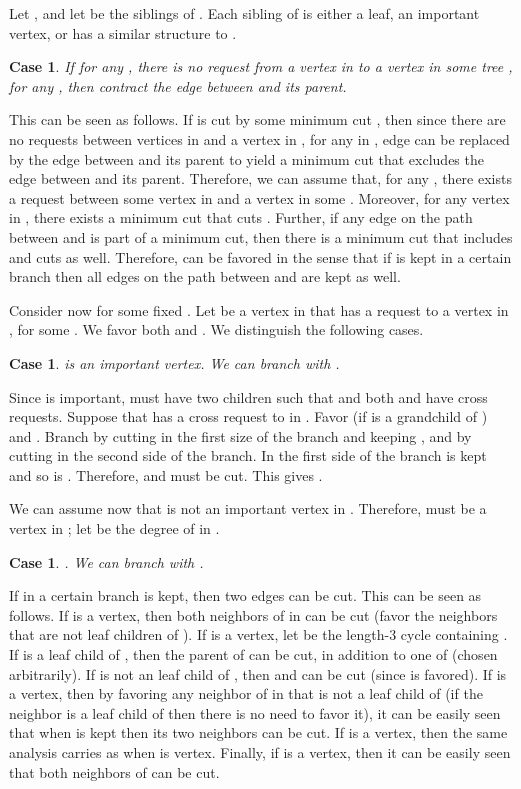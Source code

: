 \documentclass[11pt]{article}
\newtheorem{case}[theorem]{Case}
\begin{document}


Let , and let  be the siblings of . Each sibling  of  is either a leaf, an important vertex, or  has a similar structure to .

\begin{case}
\label{case:100}
If for any , there is no request from a vertex in  to a vertex in some tree , for any , then contract the edge between  and its parent.
\end{case}
This can be seen as follows. If  is cut by some minimum cut , then since there are no requests between vertices in  and a vertex in , for any  in , edge  can be replaced by the edge between  and its parent to yield a minimum cut that excludes the edge between  and its parent. Therefore, we can assume that, for any , there exists a request between some vertex in  and a vertex in some . Moreover, for any vertex  in , there exists a minimum cut that cuts . Further, if any edge  on the path between  and  is part of a minimum cut, then there is a minimum cut that includes  and cuts  as well. Therefore,  can be favored in the sense that if  is kept in a certain branch then all edges on the path between  and  are kept as well.


Consider now  for some fixed . Let  be a vertex in  that has a request to a vertex  in , for some . We favor both  and .  We distinguish the following cases.

\begin{case}
\label{case:200}
 is an important vertex. We can branch with .
\end{case}

Since  is important,  must have two children  such that  and both  and  have cross requests. Suppose that  has a cross request to  in . Favor  (if  is a grandchild of ) and . Branch by cutting  in the first size of the branch and keeping , and by cutting  in the second side of the branch. In the first side of the branch  is kept and so is . Therefore,  and  must be cut. This gives .

We can assume now that  is not an important vertex in . Therefore,  must be a vertex in ; let  be the degree of  in .

\begin{case}
\label{case:300}
.  We can branch with .
\end{case}


If in a certain branch  is kept, then two edges can be cut. This can be seen as follows. If  is a  vertex, then both neighbors of  in  can be cut (favor the neighbors that are not leaf children of ). If  is a  vertex, let  be the length-3 cycle containing .  If  is a leaf child of , then the parent of  can be cut, in addition to one of  (chosen arbitrarily). If  is not an leaf child of , then  and  can be cut (since  is favored). If  is a  vertex, then by favoring any neighbor of  in  that is not a leaf child of  (if the neighbor is a leaf child of  then there is no need to favor it), it can be easily seen that when  is kept then its two neighbors can be cut. If  is a  vertex, then the same analysis carries as when  is  vertex. Finally, if  is a  vertex, then it can be easily seen that both neighbors of  can be cut.
\end{document}
